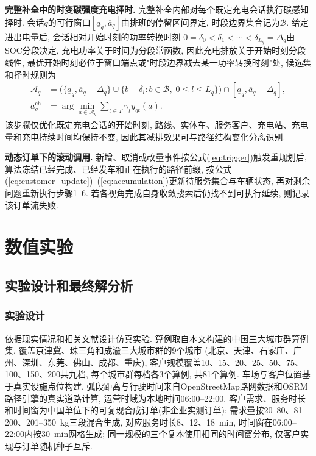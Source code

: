 \documentclass{setp-new}
\begin{document}
\textbf{完整补全中的时变碳强度充电择时.}
完整补全内部对每个既定充电会话执行碳感知择时.
会话$q$的可行窗口$[\underline a_q,\overline a_q]$由排班的停留区间界定,
时段边界集合记为$\mathcal B$.
给定进出电量后, 会话相对开始时刻的功率转换时刻
$0=\delta_0<\delta_1<\cdots<\delta_{L_q}=\Delta_q$由SOC分段决定,
充电功率关于时间为分段常函数,
因此充电排放关于开始时刻分段线性,
最优开始时刻必位于窗口端点或"时段边界减去某一功率转换时刻"处,
候选集和择时规则为
\begin{align}
\mathcal A_q&=\bigl(\{\underline a_q,\overline a_q-\Delta_q\}
\cup\{b-\delta_l:b\in\mathcal B,\;0\le l\le L_q\}\bigr)
\cap[\underline a_q,\overline a_q-\Delta_q], \label{eq:charging-candidates}\\
a_q^{\mathrm{ch}}&=\arg\min_{a\in\mathcal A_q}\sum_{t\in T}\gamma_t y_{qt}(a). \label{eq:charging-rule}
\end{align}
该步骤仅优化既定充电会话的开始时刻,
路线、实体车、服务客户、充电站、充电量和充电持续时间均保持不变,
因此其减排效果可与路径结构变化分离识别.

\textbf{动态订单下的滚动调用.}
新增、取消或改量事件按公式(\ref{eq:trigger})触发重规划后,
算法冻结已经完成、已经发车和正在执行的路径前缀,
按公式(\ref{eq:customer_update})--(\ref{eq:accumulation})更新待服务集合与车辆状态,
再对剩余问题重新执行步骤1--6.
若各视角完成自身收敛搜索后仍找不到可执行延续, 则记录该订单流失败.


\section{数值实验}

\subsection{实验设计和最终解分析}

\subsubsection{实验设计}

依据现实情况和相关文献设计仿真实验.
算例取自本文构建的中国三大城市群算例集,
覆盖京津冀、珠三角和成渝三大城市群的9个城市
(北京、天津、石家庄、广州、深圳、东莞、佛山、成都、重庆),
客户规模覆盖10、15、20、25、50、75、100、150、200共九档,
每个城市群每档各3个算例, 共81个算例.
车场与客户位置基于真实设施点位构建,
弧段距离与行驶时间来自OpenStreetMap路网数据\cite{ref:84}和OSRM路径引擎\cite{ref:85}的真实道路计算,
运营时域为本地时间06:00--22:00.
客户需求、服务时长和时间窗为中国单位下的可复现合成订单(非企业实测订单):
需求量按20--80、81--200、201--350~kg三段混合生成,
对应服务时长8、12、18~min, 时间窗在06:00--22:00内按30~min网格生成;
同一规模的三个复本使用相同的时间窗分布, 仅客户实现与订单随机种子互斥.
\end{document}

